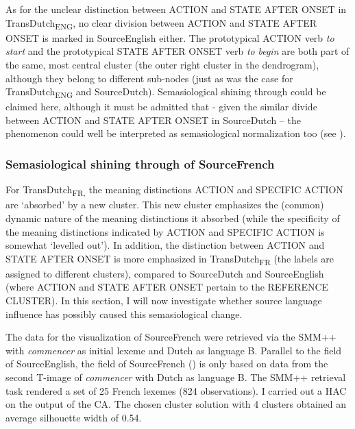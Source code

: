 As for the unclear distinction between ACTION and STATE AFTER ONSET in TransDutch\textsubscript{ENG}, no clear division between ACTION and STATE AFTER ONSET is marked in SourceEnglish either. The prototypical ACTION verb \textit{to} \textit{start} and the prototypical STATE AFTER ONSET verb \textit{to} \textit{begin} are both part of the same, most central cluster (the outer right cluster in the dendrogram), although they belong to different sub-nodes (just as was the case for TransDutch\textsubscript{ENG} and SourceDutch). Semasiological shining through could be claimed here, although it must be admitted that - given the similar divide between ACTION and STATE AFTER ONSET in SourceDutch – the phenomenon could well be interpreted as semasiological normalization too (see ).

\subsubsection{Semasiological shining through of SourceFrench}
\label{sec:4.6.1.2}  
For TransDutch\textsubscript{FR,} the meaning distinctions ACTION and {SPECIFIC} ACTION are ‘absorbed’ by a new cluster. This new cluster emphasizes the (common) dynamic nature of the meaning distinctions it absorbed (while the specificity of the meaning distinctions indicated by ACTION and {SPECIFIC} ACTION is somewhat ‘levelled out’). In addition, the distinction between ACTION and STATE AFTER ONSET is more emphasized in TransDutch\textsubscript{FR} (the labels are assigned to different clusters), compared to SourceDutch and SourceEnglish (where ACTION and STATE AFTER ONSET pertain to the REFERENCE CLUSTER). In this section, I will now investigate whether source language influence has possibly caused this semasiological change.

The data for the visualization of SourceFrench were retrieved via the SMM++ with \textit{commencer} as initial lexeme and Dutch as language B. Parallel to the field of SourceEnglish, the field of SourceFrench () is only based on data from the second T-image of \textit{commencer} with Dutch as language B. The SMM++ retrieval task rendered a set of 25 French lexemes (824 observations). I carried out a HAC on the output of the CA. The chosen cluster solution with 4 clusters obtained an average silhouette width of 0.54.

